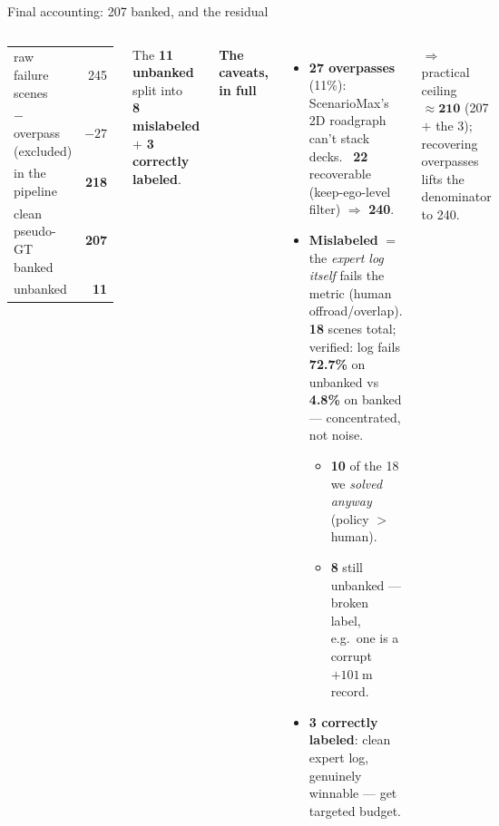 \begin{frame}{Final accounting: 207 banked, and the residual}
  \begin{columns}[T]
    \begin{center}
      \begin{tabular}{@{}lr@{}}
        \toprule
        raw failure scenes & 245 \\
        $-$ overpass (excluded) & $-27$ \\
        \midrule
        in the pipeline & \textbf{218} \\
        clean pseudo-GT banked & \textbf{207} \\
        unbanked & \textbf{11} \\
        \bottomrule
      \end{tabular}
    \end{center}
    \centering\small
    The \textbf{11 unbanked} split into\\ \textbf{8 mislabeled} $+$ \textbf{3 correctly labeled}.

    \textbf{The caveats, in full}
    \begin{itemize}
      \item \textbf{27 overpasses} (11\%): ScenarioMax's 2D roadgraph can't stack decks.
            \good\ \textbf{22} recoverable (keep-ego-level filter) $\Rightarrow$ \textbf{240}.
      \item \textbf{Mislabeled} $=$ the \emph{expert log itself} fails the metric (human
            offroad/overlap). \textbf{18} scenes total; verified: log fails \textbf{72.7\%}
            on unbanked vs \textbf{4.8\%} on banked --- concentrated, not noise.
        \begin{itemize}
          \item[\good] \textbf{10} of the 18 we \emph{solved anyway} (policy $>$ human).
          \item[$\cdot$] \textbf{8} still unbanked --- broken label, e.g.\ one is a corrupt $+101$\,m record.
        \end{itemize}
      \item \textbf{3 correctly labeled}: clean expert log, genuinely winnable --- get targeted budget.
    \end{itemize}
    \vspace{0.1em}
    {\scriptsize $\Rightarrow$ practical ceiling $\approx \mathbf{210}$ (207 $+$ the 3); recovering overpasses lifts the denominator to 240.}
  \end{columns}
\end{frame}

